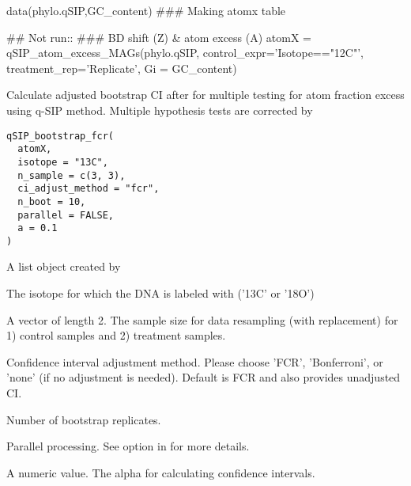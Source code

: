 \documentclass[a4paper]{book}
\begin{document}
%
\begin{Examples}
\begin{ExampleCode}
data(phylo.qSIP,GC_content)
### Making atomx table

## Not run::
### BD shift (Z) & atom excess (A)
atomX = qSIP_atom_excess_MAGs(phylo.qSIP,
                         control_expr='Isotope=="12C"',
                         treatment_rep='Replicate',
                         Gi = GC_content)

\end{ExampleCode}
\end{Examples}
%
\begin{Description}\relax
Calculate adjusted bootstrap CI after for multiple testing for atom fraction excess using q-SIP method. Multiple hypothesis tests are corrected by
\end{Description}
%
\begin{Usage}
\begin{verbatim}
qSIP_bootstrap_fcr(
  atomX,
  isotope = "13C",
  n_sample = c(3, 3),
  ci_adjust_method = "fcr",
  n_boot = 10,
  parallel = FALSE,
  a = 0.1
)
\end{verbatim}
\end{Usage}
%
\begin{Arguments}
\begin{ldescription}
\item[\code{atomX}] A list object created by 

\item[\code{isotope}] The isotope for which the DNA is labeled with ('13C' or '18O')

\item[\code{n\_sample}] A vector of length 2. The sample size for data resampling (with replacement) for 1) control samples and 2) treatment samples.

\item[\code{ci\_adjust\_method}] Confidence interval adjustment method. Please choose 'FCR', 'Bonferroni', or 'none' (if no adjustment is needed). Default is FCR and also provides unadjusted CI.

\item[\code{n\_boot}] Number of bootstrap replicates.

\item[\code{parallel}] Parallel processing. See  option in  for more details.

\item[\code{a}] A numeric value. The alpha for calculating confidence intervals.
\end{ldescription}
\end{Arguments}
\end{document}
